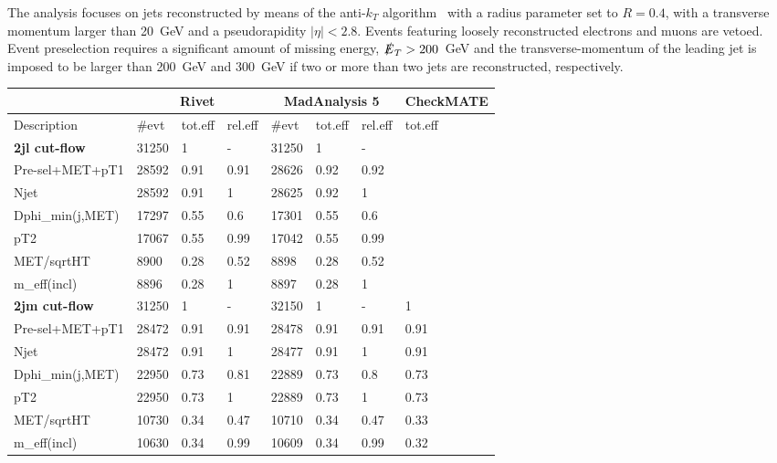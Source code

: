 \documentclass[11pt]{cernrep}
\begin{document}
The analysis focuses on jets reconstructed by means of the anti-$k_T$
algorithm~\cite{Cacciari:2008gp} with a radius parameter set to $R=0.4$, with
a transverse momentum larger than 20~GeV and a pseudorapidity $|\eta|<2.8$.
Events featuring loosely reconstructed electrons and muons are vetoed.
Event preselection requires a significant amount of missing energy,
$\slashed{E}_T > 200$~GeV and the transverse-momentum of the leading jet is
imposed to be larger than 200~GeV and 300~GeV if two or more than two jets are
reconstructed, respectively.

\begin{table}[b!]
\footnotesize
 \centering
  \begin{tabular}{ | l || l | l | l || l | l | l || l | }
\hline
    &  \multicolumn{3}{c||}{\bf Rivet} & \multicolumn{3}{c||}{\bf MadAnalysis 5} &   {\bf CheckMATE}   \\ \hline
  Description       & \#evt & tot.eff & rel.eff & \#evt & tot.eff & rel.eff &   tot.eff   \\ \hline \hline
{\bf 2jl cut-flow}                  & 31250 & 1 & - & 31250 & 1 & - & \   \\ \hline
Pre-sel+MET+pT1   & 28592 & 0.91 & 0.91 & 28626 & 0.92 & 0.92 & \   \\ \hline
Njet              & 28592 & 0.91 & 1 & 28625 & 0.92 & 1 & \   \\ \hline
Dphi\_min(j,MET)   & 17297 & 0.55 & 0.6 & 17301 & 0.55 & 0.6 & \   \\ \hline
pT2               & 17067 & 0.55 & 0.99 & 17042 & 0.55 & 0.99 & \   \\ \hline
MET/sqrtHT        & 8900 & 0.28 & 0.52 & 8898 & 0.28 & 0.52 & \   \\ \hline
m\_eff(incl)       & 8896 & 0.28 & 1 & 8897 & 0.28 & 1 & \   \\ \hline
\hline
{\bf 2jm cut-flow} & 31250 & 1 & - & 32150 & 1 & - & 1  \\ \hline
Pre-sel+MET+pT1   & 28472 & 0.91 & 0.91 & 28478 & 0.91 & 0.91 & 0.91  \\ \hline
Njet              & 28472 & 0.91 & 1 & 28477 & 0.91 & 1 & 0.91  \\ \hline
Dphi\_min(j,MET)   & 22950 & 0.73 & 0.81 & 22889 & 0.73 & 0.8 & 0.73  \\ \hline
pT2               & 22950 & 0.73 & 1 & 22889 & 0.73 & 1 & 0.73  \\ \hline
MET/sqrtHT        & 10730 & 0.34 & 0.47 & 10710 & 0.34 & 0.47 & 0.33  \\ \hline
m\_eff(incl)       & 10630 & 0.34 & 0.99 & 10609 & 0.34 & 0.99 & 0.32  \\ \hline

\end{tabular}
\end{table}
\end{document}
